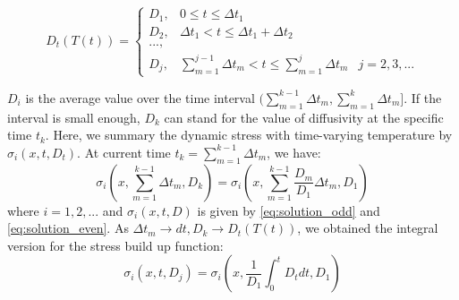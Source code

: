 \begin{equation} \label{eq:D_temp}
D_t(T(t))=\left\{
\begin{aligned}
D_{1},&{0\leq t\leq \Delta t_1} \\
D_{2},&{\Delta t_1<t\leq \Delta t_1+\Delta t_2} \\
...,\\
D_{j},&{\sum\limits_{m=1}^{j-1} \Delta t_m<t\leq\sum\limits_{m=1}^{j} \Delta t_m}&{j=2,3,...}
\end{aligned}
\right.
\end{equation}

$D_i$ is the average value over the time interval $(\sum\limits_{m=1}^{k-1} \Delta t_m, \sum\limits_{m=1}^{k} \Delta t_m]$. If the interval is small enough, $D_k$ can stand for the value of diffusivity at the specific time $t_k$. Here, we summary the dynamic stress with time-varying temperature by $\sigma_i(x,t,D_t)$. At current time $t_k=\sum\limits_{m=1}^{k-1} \Delta t_m$, we have:
\begin{equation} \label{eq:D_temp_sigma}
\sigma_i (x,\sum\limits_{m=1}^{k-1} \Delta t_m,D_k )=\sigma_i(x,\sum\limits_{m=1}^{k-1} \frac{D_m}{D_{1}}\Delta t_m,D_{1})
\end{equation}
where $i=1,2,...$ and $\sigma_i(x,t,D)$ is given by \eqref{eq:solution_odd} and \eqref{eq:solution_even}. As $\Delta t_m \to dt, D_k \to D_t(T(t))$, we obtained the integral version for the stress build up function:
\begin{equation} \label{eq:D_temp_sigma_2}
\sigma_i (x,t,D_j )=\sigma_i(x,\frac{1}{D_{1}}\int_0^t{D_tdt},D_{1})
\end{equation}
